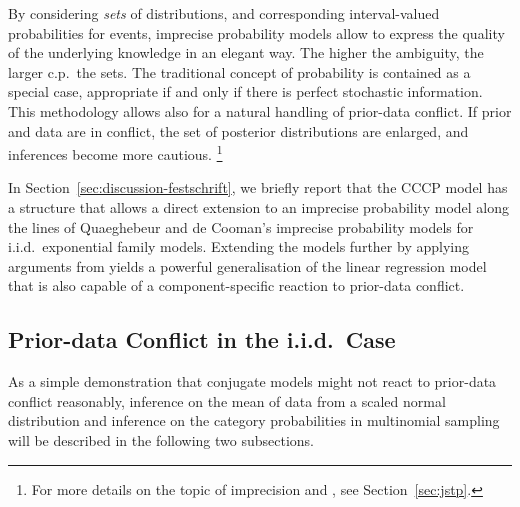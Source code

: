 By considering \emph{sets} of distributions, and corresponding
interval-valued probabilities for events, imprecise probability models allow
to express the quality of the underlying knowledge in an elegant way.
The higher the ambiguity, the larger c.p.\ the sets.
The traditional concept of probability is contained as a special case,
appropriate if and only if there is perfect stochastic information.
This methodology allows also for a natural handling of prior-data conflict.
If prior and data are in conflict, the set of posterior distributions are enlarged,
and inferences become more cautious.%
\footnote{For more details on the topic of imprecision and \pdc, see Section~\ref{sec:jstp}.}

In Section~\ref{sec:discussion-festschrift}, we briefly report that the CCCP model has a structure
that allows a direct extension to an imprecise probability model
along the lines of Quaeghebeur and de Cooman's \parencite*{2005:quaeghebeurcooman} imprecise probability models
for i.i.d.\ exponential family models. Extending the models further
by applying arguments from \textcite[see Section~\ref{sec:jstp}]{Walter2009a}
yields a powerful generalisation
of the linear regression model that is also capable of a component-specific reaction to prior-data conflict.

\subsection{Prior-data Conflict in the i.i.d.\ Case}
\label{sec:iid}

As a simple demonstration that conjugate models might not react to
prior-data conflict reasonably, inference on the mean of data from a
scaled normal distribution and inference on the category
probabilities in multinomial sampling will be described in the
following two subsections.

